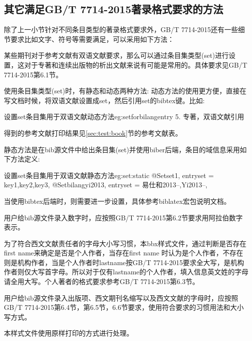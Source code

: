 \subsection{其它满足GB/T 7714-2015著录格式要求的方法}

除了上一小节针对不同条目类型的著录格式要求外，GB/T 7714-2015还有一些细节要求比如文字、符号等需要满足，可以采用如下方法：

\begin{property}{}{}
某些期刊对于参考文献有双语文献要求，那么可以通过条目集类型(set)进行设置，这对于专著和连续出版物的析出文献来说有可能是常用的。具体要求见GB/T 7714-2015第6.1节。
\end{property}

使用条目集类型(set)时，有静态和动态两种方法:
动态方法的使用更方便，直接在写文档时候，将双语文献设置成set，然后引用set的bibtex键。比如:
\begin{codetex}{设置set条目集用于双语文献动态方法}{eg:setforbilangentry}
5. 专著，双语文献引用\cite{bilangyi2013}
\end{codetex}

得到的参考文献打印结果见\ref{sec:test:book}节的参考文献表。

静态方法是在bib源文件中给出条目集(set)并使用biber后端，条目的域信息采用如下方法定义:
\begin{codetex}{设置set条目集用于双语文献静态方法}{eg:set:static}
@Set{set1,
entryset = {key1,key2,key3},
}
@Set{bilangyi2013,
entryset = {易仕和2013--,Yi2013--},
}
\end{codetex}
当使用bibtex后端时，则需要进一步设置，具体参考biblatex宏包说明文档。

\begin{property}{}{}
用户给bib源文件录入数字时，应按照GB/T 7714-2015第6.2节要求用阿拉伯数字表示。

为了符合西文文献责任者的字母大小写习惯，本bbx样式文件，通过判断是否存在first name来确定是否是个人作者，当存在first name 时认为是个人作者，不存在则是机构作者，当是个人作者时lastname按GB/T 7714-2015要求全大写，是机构作者则仅大写首字母。所以对于仅有lastname的个人作者，填入信息英文姓的字母请全用大写。个人著者的格式要求参考GB/T 7714-2015第6.3节。
\end{property}

\begin{property}{}{}
用户给bib源文件录入出版项、西文期刊名缩写以及西文文献的字母时，应按照GB/T 7714-2015第6.4节，第6.5节，6.6节要求，使用符合要求的习惯用法和大小写方式。

本样式文件使用原样打印的方式进行处理。
\end{property}

